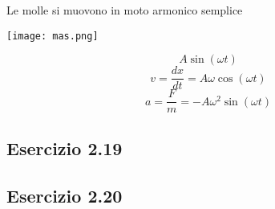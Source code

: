 \documentclass[../../main.tex]{subfiles}
\begin{document}
Le molle si muovono in moto armonico semplice\\
\begin{minipage}{0.2\textwidth}
    \centering
    \texttt{[image: mas.png]}
\end{minipage}
\begin{minipage}{0.8\textwidth}
    \centering
    \[
        A\sin(\omega t)
    \]
    \[
        v = \dfrac{dx}{dt} = A\omega\cos(\omega t)
    \]
    \[
        a = \dfrac{F}{m} = -A\omega^2\sin(\omega t)
    \]
\end{minipage}

\subsection{Esercizio 2.19}
\subsection{Esercizio 2.20}
\end{document}
